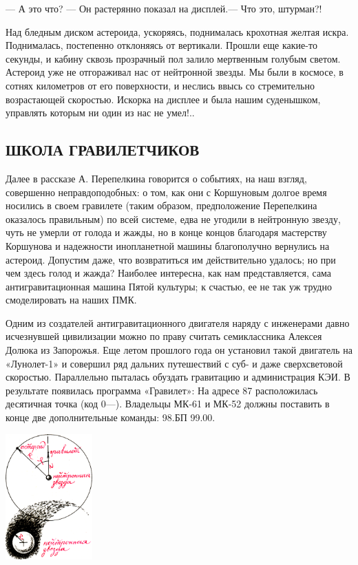 \documentclass[11pt,a4paper,oneside]{article}
\begin{document}
— А это что? — Он растерянно показал на дисплей.— Что это, штурман?!

Над бледным диском астероида, ускоряясь, поднималась крохотная желтая искра. Поднималась, постепенно отклоняясь от вертикали.
Прошли еще какие-то секунды, и кабину сквозь прозрачный пол залило мертвенным голубым светом. Астероид уже не отгораживал нас от нейтронной звезды. Мы были в космосе, в сотнях километров от его поверхности, и неслись ввысь со стремительно возрастающей скоростью. Искорка на дисплее и была нашим суденышком, управлять которым ни один из нас не умел!..

\subsection{ШКОЛА ГРАВИЛЕТЧИКОВ}

Далее в рассказе А. Перепелкина говорится о событиях, на наш взгляд, совершенно неправдоподобных: о том, как они с Коршуновым долгое время носились в своем гравилете (таким образом, предположение Перепелкина оказалось правильным) по всей системе, едва не угодили в нейтронную звезду, чуть не умерли от голода и жажды, но в конце концов благодаря мастерству Коршунова и надежности инопланетной машины благополучно вернулись на астероид. Допустим даже, что возвратиться им действительно удалось; но при чем здесь голод и жажда? Наиболее интересна, как нам представляется, сама антигравитационная машина Пятой культуры; к счастью, ее не так уж трудно смоделировать на наших ПМК.

Одним из создателей антигравитационного двигателя наряду с инженерами давно исчезнувшей цивилизации можно по праву считать семиклассника Алексея Долюка из Запорожья. Еще летом прошлого года он установил такой двигатель на «Лунолет-1» и совершил ряд дальних путешествий с суб- и даже сверхсветовой скоростью. Параллельно пыталась обуздать гравитацию и администрация КЭИ. В результате появилась программа «Гравилет»:
На адресе 87 расположилась десятичная точка (код 0—). Владельцы МК-61 и МК-52 должны поставить в конце две дополнительные команды: 98.БП 99.00.

\includegraphics[width=0.25\textwidth]{pulsar_nav}
\end{document}
